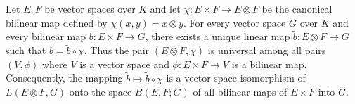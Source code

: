 Let $E, F$ be vector spaces over $K$ and let $\chi: E \times F \to E \otimes F$ be the canonical bilinear map defined by $\chi(x, y) = x \otimes y$. For every vector space $G$ over $K$ and every bilinear map $b: E \times F \to G$, there exists a unique linear map $\tilde{b}: E \otimes F \to G$ such that $b = \tilde{b} \circ \chi$. Thus the pair $(E \otimes F, \chi)$ is universal among all pairs $(V, \phi)$ where $V$ is a vector space and $\phi: E \times F \to V$ is a bilinear map. Consequently, the mapping $\tilde{b} \mapsto \tilde{b} \circ \chi$ is a vector space isomorphism of $L(E \otimes F, G)$ onto the space $B(E, F; G)$ of all bilinear maps of $E \times F$ into $G$.
